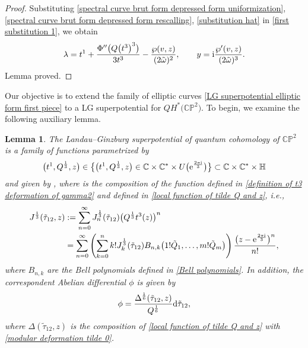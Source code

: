 \documentclass[11pt]{article}
\numberwithin{equation}{section}
\numberwithin{equation}{section}
\newtheorem{Lemma}[Theorem]{Lemma}
\begin{document}
\begin{proof}
Substituting \eqref{spectral curve brut form depressed form uniformization}, \eqref{spectral curve brut form depressed form rescalling}, \eqref{substitution hat} in \eqref{first substitution 1}, we obtain
\begin{gather*}
\lambda=t^1+\frac{\Phi^{\prime\prime}\bigl(Q\bigl(t^3\bigr)^3\bigr)}{3t^3}-\frac{\wp(v,z)}{(2\tilde\omega)^2},\qquad
y={\rm i}\frac{\wp^{\prime}(v,z)}{(2\tilde\omega)^3}.
\end{gather*}
Lemma proved.
\end{proof}

Our objective is to extend the family of elliptic curves \eqref{LG superpotential elliptic form first piece} to a LG superpotential for $QH^{*}\bigl(\mathbb{CP}^2\bigr)$. To begin, we examine the following auxiliary lemma.

\begin{Lemma}
The Landau--Ginzburg superpotential of quantum cohomology of $\mathbb{CP}^2$ is a family of functions
parametrized by
\begin{gather*}
\bigl(t^1,Q^{\frac{1}{3}},z\bigr)\in 	\bigl\{ \bigl(t^1,Q^{\frac{1}{3}},z\bigr) \in \mathbb{C}\times\mathbb{C}^{*}\times U\bigl({\rm e}^{\frac{2\pi {\rm i}}{3}}\bigr) \bigr\}\subset \mathbb{C}\times\mathbb{C}^{*}\times\mathbb{H}
\end{gather*}
and given by
,
where  is the composition of the function  defined in \eqref{definition of t3 deformation of gamma2} and  defined in \eqref{local function of tilde Q and z}, i.e.,
\begin{align*}
J^{\frac{1}{3}}(\tilde\tau_{12}, z)&:=\sum_{n=0}^{\infty}J_n^{\frac{1}{3}}(\tilde\tau_{12})\bigl( Q^{\frac{1}{3}}t^3(z)\bigr)^n\\
&=\sum_{n=0}^{\infty}\left( \sum_{k=0}^{n} k! J_k^{\frac{1}{3}}(\tilde\tau_{12}) B_{n,k}\bigl(1!\tilde Q_1,\dots,m!\tilde Q_m\bigr) \right)\frac{\bigl(z-{\rm e}^{\frac{2\pi {\rm i}}{3}} \bigr)^n}{n!},
\end{align*}
where $B_{n,k}$ are the Bell polynomials defined in \eqref{Bell polynomials}.
 In addition, the correspondent Abelian differential $\phi$ is given by
\begin{gather*}
\phi=\frac{\Delta^{\frac{1}{6}}(\tilde\tau_{12},z)}{Q^{\frac{1}{6}}} {\rm d}\tilde\tau_{12},
\end{gather*}
where $\Delta(\tilde\tau_{12},z)$ is the composition of \eqref{local function of tilde Q and z} with \eqref{modular deformation tilde 0}.
\end{Lemma}
\end{document}
